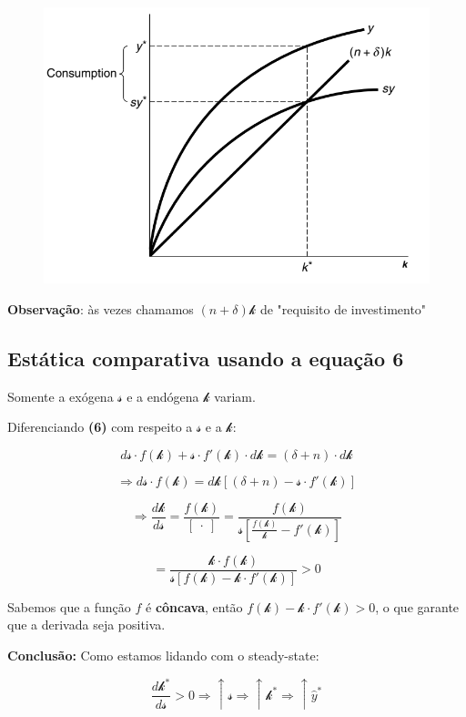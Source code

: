 \documentclass[a4paper,12pt]{article}[abntex2]
\begin{document}
\begin{figure}[H]
    \centering
    \includegraphics[width=0.75\linewidth]{Imagens/a5i1.png}
\end{figure}
\textbf{Observação}: às vezes chamamos \((n+\delta)\mathcal{k}\) de "requisito de investimento"


\subsection{\textbf{Estática comparativa} usando a equação 6}
Somente a exógena \( \mathcal{s} \) e a endógena \( \mathcal{k} \) variam.

Diferenciando \textbf{(6)} com respeito a \( \mathcal{s} \) e a \( \mathcal{k} \):

\[
d \mathcal{s} \cdot f(\mathcal{k}) + \mathcal{s} \cdot f'(\mathcal{k}) \cdot d\mathcal{k} = (\delta + n) \cdot d\mathcal{k}
\]

\[
\Rightarrow d \mathcal{s} \cdot f(\mathcal{k}) = d\mathcal{k} \left[ (\delta + n) - \mathcal{s} \cdot f'(\mathcal{k}) \right]
\]

\[
\Rightarrow \frac{d\mathcal{k}}{d\mathcal{s}} = \frac{f(\mathcal{k})}{[\ \cdot \ ]} = \frac{f(\mathcal{k})}{\mathcal{s} \left[ \frac{f(\mathcal{k})}{\mathcal{k}} - f'(\mathcal{k}) \right]}
\]

\[
= \frac{\mathcal{k} \cdot f(\mathcal{k})}{\mathcal{s} \left[ f(\mathcal{k}) - \mathcal{k} \cdot f'(\mathcal{k}) \right]} > 0
\]

Sabemos que a função \( f \) é \textbf{côncava}, então \( f(\mathcal{k}) - \mathcal{k} \cdot f'(\mathcal{k}) > 0 \), o que garante que a derivada seja positiva.

\textbf{Conclusão:} Como estamos lidando com o steady-state:

\[
\frac{d\mathcal{k}^*}{d\mathcal{s}} > 0 \Rightarrow \uparrow \mathcal{s} \Rightarrow \uparrow \mathcal{k}^* \Rightarrow \uparrow \hat{y}^*
\]
\end{document}
